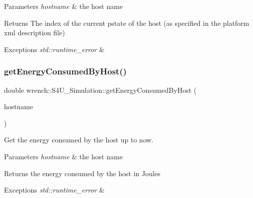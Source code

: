 \begin{DoxyParams}{Parameters}
{\em hostname} & the host name \\
\hline
\end{DoxyParams}
\begin{DoxyReturn}{Returns}
The index of the current pstate of the host (as specified in the platform xml description file) 
\end{DoxyReturn}

\begin{DoxyExceptions}{Exceptions}
{\em std\+::runtime\+\_\+error} & \\
\hline
\end{DoxyExceptions}
\mbox{\label{classwrench_1_1_s4_u___simulation_a88c0d6933d98a0c3330f62139ac9f6d5}} 
\subsubsection{\texorpdfstring{get\+Energy\+Consumed\+By\+Host()}{getEnergyConsumedByHost()}}
{\footnotesize\ttfamily double wrench\+::\+S4\+U\+\_\+\+Simulation\+::get\+Energy\+Consumed\+By\+Host (\begin{DoxyParamCaption}\item[{const std\+::string \&}]{hostname }\end{DoxyParamCaption})\hspace{0.3cm}{\ttfamily [static]}}



Get the energy consumed by the host up to now. 


\begin{DoxyParams}{Parameters}
{\em hostname} & the host name \\
\hline
\end{DoxyParams}
\begin{DoxyReturn}{Returns}
the energy consumed by the host in Joules 
\end{DoxyReturn}

\begin{DoxyExceptions}{Exceptions}
{\em std\+::runtime\+\_\+error} & \\
\hline
\end{DoxyExceptions}
\mbox{\label{classwrench_1_1_s4_u___simulation_a37ddab7be97c813bcf5e02bd512cd519}} 
